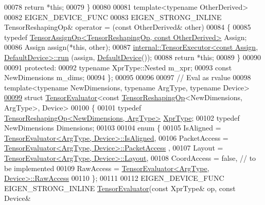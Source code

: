 \begin{DoxyCode}
00078       \textcolor{keywordflow}{return} *\textcolor{keyword}{this};
00079     \}
00080 
00081     \textcolor{keyword}{template}<\textcolor{keyword}{typename} OtherDerived>
00082     EIGEN\_DEVICE\_FUNC
00083     EIGEN\_STRONG\_INLINE TensorReshapingOp& operator = (\textcolor{keyword}{const} OtherDerived& other)
00084     \{
00085       \textcolor{keyword}{typedef} \hyperlink{class_eigen_1_1_tensor_assign_op}{TensorAssignOp<TensorReshapingOp, const OtherDerived>}
       Assign;
00086       Assign assign(*\textcolor{keyword}{this}, other);
00087       \hyperlink{class_eigen_1_1internal_1_1_tensor_executor}{internal::TensorExecutor<const Assign, DefaultDevice>::run}
      (assign, \hyperlink{struct_eigen_1_1_default_device}{DefaultDevice}());
00088       \textcolor{keywordflow}{return} *\textcolor{keyword}{this};
00089     \}
00090 
00091   \textcolor{keyword}{protected}:
00092     \textcolor{keyword}{typename} XprType::Nested m\_xpr;
00093     \textcolor{keyword}{const} NewDimensions m\_dims;
00094 \};
00095 
00096 
00097 \textcolor{comment}{// Eval as rvalue}
00098 \textcolor{keyword}{template}<\textcolor{keyword}{typename} NewDimensions, \textcolor{keyword}{typename} ArgType, \textcolor{keyword}{typename} Device>
\hyperlink{struct_eigen_1_1_tensor_evaluator_3_01const_01_tensor_reshaping_op_3_01_new_dimensions_00_01_arg_type_01_4_00_01_device_01_4}{00099} \textcolor{keyword}{struct }\hyperlink{struct_eigen_1_1_tensor_evaluator}{TensorEvaluator}<const \hyperlink{class_eigen_1_1_tensor_reshaping_op}{TensorReshapingOp}<NewDimensions, ArgType>, 
      Device>
00100 \{
00101   \textcolor{keyword}{typedef} \hyperlink{class_eigen_1_1_tensor_reshaping_op}{TensorReshapingOp<NewDimensions, ArgType>} 
      \hyperlink{class_eigen_1_1_tensor_reshaping_op}{XprType};
00102   \textcolor{keyword}{typedef} NewDimensions Dimensions;
00103 
00104   \textcolor{keyword}{enum} \{
00105     IsAligned = \hyperlink{struct_eigen_1_1_tensor_evaluator}{TensorEvaluator<ArgType, Device>::IsAligned},
00106     PacketAccess = \hyperlink{struct_eigen_1_1_tensor_evaluator}{TensorEvaluator<ArgType, Device>::PacketAccess}
      ,
00107     Layout = \hyperlink{struct_eigen_1_1_tensor_evaluator}{TensorEvaluator<ArgType, Device>::Layout},
00108     CoordAccess = \textcolor{keyword}{false},  \textcolor{comment}{// to be implemented}
00109     RawAccess = \hyperlink{struct_eigen_1_1_tensor_evaluator}{TensorEvaluator<ArgType, Device>::RawAccess}
00110   \};
00111 
00112   EIGEN\_DEVICE\_FUNC EIGEN\_STRONG\_INLINE \hyperlink{struct_eigen_1_1_tensor_evaluator}{TensorEvaluator}(\textcolor{keyword}{const} XprType& op, \textcolor{keyword}{const} Device& 

\end{DoxyCode}
